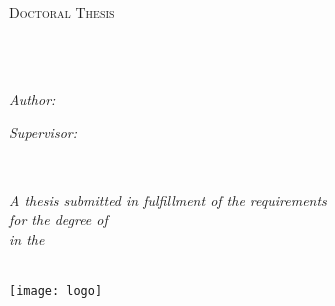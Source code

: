 \documentclass[
11pt, %
english, %
onehalfspacing, %
headsepline, %
]{MastersDoctoralThesis} %
\author{Bakytzhan \textsc{Urazbekov}} %
\begin{document}
\frontmatter %

\pagestyle{plain} %


\begin{titlepage}
\begin{center}

\vspace*{.06\textheight}
{\scshape\LARGE \univname\par}\vspace{1.5cm} %
\textsc{\Large Doctoral Thesis}\\[0.5cm] %

\HRule \\[0.4cm] %
{\huge \bfseries \ttitle\par}\vspace{0.4cm} %
\HRule \\[1.5cm] %
 
\begin{minipage}[t]{0.4\textwidth}
\begin{flushleft} \large
\emph{Author:}\\
\href{https://www.researchgate.net/profile/Bakytzhan_Urazbekov}{\authorname} %
\end{flushleft}
\end{minipage}
\begin{minipage}[t]{0.4\textwidth}
\begin{flushright} \large
\emph{Supervisor:} \\
\href{https://www.researchgate.net/profile/Nunzio_Itaco}{\supname} %
\end{flushright}
\end{minipage}\\[3cm]
 
\vfill

\large \textit{A thesis submitted in fulfillment of the requirements\\ for the degree of \degreename}\\[0.3cm] %
\textit{in the}\\[0.4cm]
\deptname\\[2cm] %
 
\vfill

\texttt{[image: logo]} %
 
\end{center}
\end{titlepage}
\end{document}

